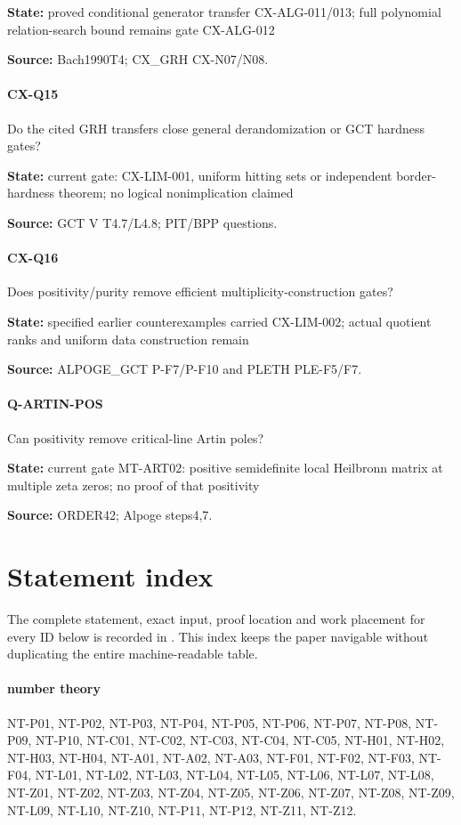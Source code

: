\documentclass[11pt,a4paper]{article}
\begin{document}
\textbf{State:} proved conditional generator transfer CX-ALG-011/\allowbreak{}013; full polynomial relation-search bound remains gate CX-ALG-012

\textbf{Source:} Bach1990T4; CX\_\allowbreak{}GRH CX-N07/\allowbreak{}N08.

\paragraph{CX-Q15} Do the cited GRH transfers close general derandomization or GCT hardness gates?

\textbf{State:} current gate:\allowbreak{} CX-LIM-001, uniform hitting sets or independent border-hardness theorem; no logical nonimplication claimed

\textbf{Source:} GCT V T4.\allowbreak{}7/\allowbreak{}L4.\allowbreak{}8; PIT/\allowbreak{}BPP questions.

\paragraph{CX-Q16} Does positivity/\allowbreak{}purity remove efficient multiplicity-construction gates?

\textbf{State:} specified earlier counterexamples carried CX-LIM-002; actual quotient ranks and uniform data construction remain

\textbf{Source:} ALPOGE\_\allowbreak{}GCT P-F7/\allowbreak{}P-F10 and PLETH PLE-F5/\allowbreak{}F7.

\paragraph{Q-ARTIN-POS} Can positivity remove critical-line Artin poles?

\textbf{State:} current gate MT-ART02:\allowbreak{} positive semidefinite local Heilbronn matrix at multiple zeta zeros; no proof of that positivity

\textbf{Source:} ORDER42; Alpoge steps4,7.
\section*{Statement index}
The complete statement, exact input, proof location and work placement for
every ID below is recorded in . This index keeps
the paper navigable without duplicating the entire machine-readable table.
\paragraph{number theory} NT-P01, NT-P02, NT-P03, NT-P04, NT-P05, NT-P06, NT-P07, NT-P08, NT-P09, NT-P10, NT-C01, NT-C02, NT-C03, NT-C04, NT-C05, NT-H01, NT-H02, NT-H03, NT-H04, NT-A01, NT-A02, NT-A03, NT-F01, NT-F02, NT-F03, NT-F04, NT-L01, NT-L02, NT-L03, NT-L04, NT-L05, NT-L06, NT-L07, NT-L08, NT-Z01, NT-Z02, NT-Z03, NT-Z04, NT-Z05, NT-Z06, NT-Z07, NT-Z08, NT-Z09, NT-L09, NT-L10, NT-Z10, NT-P11, NT-P12, NT-Z11, NT-Z12.
\end{document}
